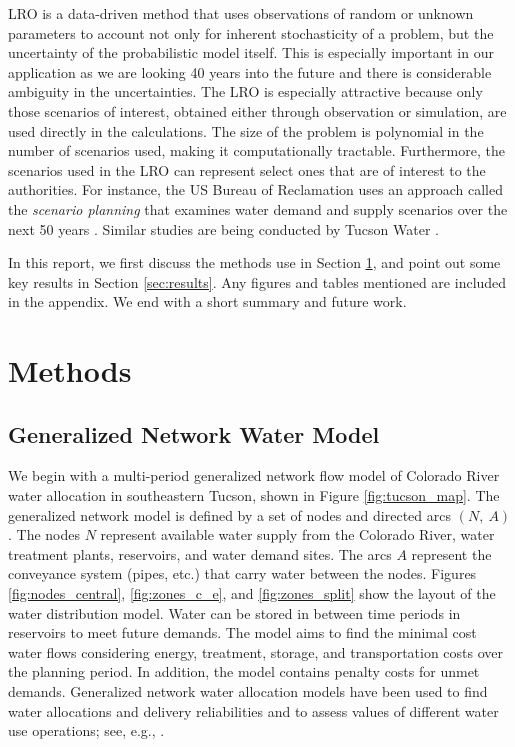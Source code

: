 \documentclass[12pt]{amsart}
\begin{document}
LRO is a data-driven method that uses observations of random or unknown parameters to account not only for inherent stochasticity of a problem, but the uncertainty of the probabilistic model itself.
This is especially important in our application as we are looking 40 years into the future and there is considerable ambiguity in the uncertainties.
The LRO is especially attractive because only those scenarios of interest, obtained either through observation or simulation, are used directly in the calculations.
The size of the problem is polynomial in the number of scenarios used, making it computationally tractable.
Furthermore, the scenarios used in the LRO can represent select ones that are of interest to the authorities. 
For instance, the US Bureau of Reclamation uses an approach called the {\it scenario planning} that examines water demand and supply scenarios over the next 50 years \cite{usbr_11}.  
Similar studies are being conducted by Tucson Water  \cite{cityofTucsonWaterPlan}.


In this report, we first discuss the methods use in Section \ref{sec:methods}, and point out some key results in Section \ref{sec:results}.
Any figures and tables mentioned are included in the appendix.
We end with a short summary and future work.



\section{Methods}
\label{sec:methods}

\subsection{Generalized Network Water Model} 
\label{sec:network_model}

We begin with a multi-period generalized network flow model of Colorado River water allocation in southeastern Tucson, shown in Figure \ref{fig:tucson_map}.
The generalized network model is defined by a set of nodes and directed arcs $(N,\: A)$.
The nodes $N$ represent available water supply from the Colorado River, water treatment plants, reservoirs, and water demand sites.
The arcs $A$ represent the conveyance system (pipes, etc.) that carry water between the nodes.
Figures \ref{fig:nodes_central}, \ref{fig:zones_c_e}, and \ref{fig:zones_split} show the layout of the water distribution model.
Water can be stored in between time periods in reservoirs to meet future demands.
The model aims to find the minimal cost water flows considering energy, treatment, storage, and transportation costs over the planning period. 
In addition, the model contains penalty costs for unmet demands. 
Generalized network water allocation models have been used to find water allocations and delivery reliabilities and to assess values of different water use operations; see, e.g., \cite{draper_etal_03}. 
\end{document}
